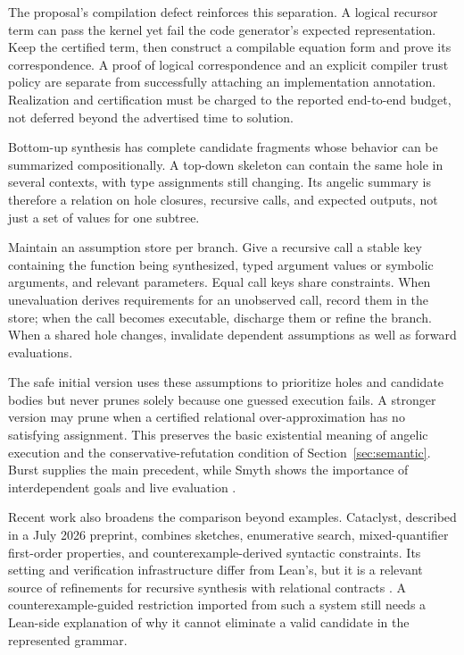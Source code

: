 The proposal's compilation defect reinforces this separation. A logical
recursor term can pass the kernel yet fail the code generator's expected
representation. Keep the certified term, then construct a compilable equation
form and prove its correspondence. A proof of logical correspondence and an
explicit compiler trust policy are separate from successfully attaching an
implementation annotation. Realization and certification must be charged to
the reported end-to-end budget, not deferred beyond the advertised time to
solution.


Bottom-up synthesis has complete candidate fragments whose behavior can be
summarized compositionally. A top-down skeleton can contain the same hole in
several contexts, with type assignments still changing. Its angelic summary
is therefore a relation on hole closures, recursive calls, and expected
outputs, not just a set of values for one subtree.

Maintain an assumption store per branch. Give a recursive call a stable key
containing the function being synthesized, typed argument values or symbolic
arguments, and relevant parameters. Equal call keys share constraints. When
unevaluation derives requirements for an unobserved call, record them in the
store; when the call becomes executable, discharge them or refine the branch.
When a shared hole changes, invalidate dependent assumptions as well as
forward evaluations.

The safe initial version uses these assumptions to prioritize holes and
candidate bodies but never prunes solely because one guessed execution fails.
A stronger version may prune when a certified relational over-approximation
has no satisfying assignment. This preserves the basic existential meaning
of angelic execution and the conservative-refutation condition of
Section~\ref{sec:semantic}. Burst supplies the main precedent, while Smyth
shows the importance of interdependent goals and live evaluation
\cite{burst,smyth}.

Recent work also broadens the comparison beyond examples. Cataclyst, described
in a July 2026 preprint, combines sketches, enumerative search, mixed-quantifier
first-order properties, and counterexample-derived syntactic constraints.
Its setting and verification infrastructure differ from Lean's, but it is a
relevant source of refinements for recursive synthesis with relational
contracts \cite{cataclyst}. A counterexample-guided restriction imported from
such a system still needs a Lean-side explanation of why it cannot eliminate
a valid candidate in the represented grammar.

